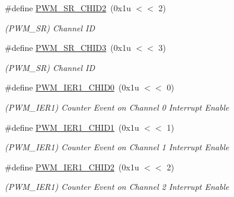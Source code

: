 \begin{DoxyCompactItemize}
\#define \mbox{\hyperlink{group__SAME70__PWM_gad0340aa3419df5dd39b9cd56c4b98862}{P\+W\+M\+\_\+\+S\+R\+\_\+\+C\+H\+I\+D2}}~(0x1u $<$$<$ 2)
\begin{DoxyCompactList}\small\item\em (P\+W\+M\+\_\+\+SR) Channel ID \end{DoxyCompactList}\item 
\mbox{\label{group__SAME70__PWM_gab8c704ff17cd4890571f8794c0ae0ecc}} 
\#define \mbox{\hyperlink{group__SAME70__PWM_gab8c704ff17cd4890571f8794c0ae0ecc}{P\+W\+M\+\_\+\+S\+R\+\_\+\+C\+H\+I\+D3}}~(0x1u $<$$<$ 3)
\begin{DoxyCompactList}\small\item\em (P\+W\+M\+\_\+\+SR) Channel ID \end{DoxyCompactList}\item 
\mbox{\label{group__SAME70__PWM_gacec10dad8055a8b5b3c7d901efc11c44}} 
\#define \mbox{\hyperlink{group__SAME70__PWM_gacec10dad8055a8b5b3c7d901efc11c44}{P\+W\+M\+\_\+\+I\+E\+R1\+\_\+\+C\+H\+I\+D0}}~(0x1u $<$$<$ 0)
\begin{DoxyCompactList}\small\item\em (P\+W\+M\+\_\+\+I\+E\+R1) Counter Event on Channel 0 Interrupt Enable \end{DoxyCompactList}\item 
\mbox{\label{group__SAME70__PWM_gadf1bd2e8c79a879b4137063f1c78db41}} 
\#define \mbox{\hyperlink{group__SAME70__PWM_gadf1bd2e8c79a879b4137063f1c78db41}{P\+W\+M\+\_\+\+I\+E\+R1\+\_\+\+C\+H\+I\+D1}}~(0x1u $<$$<$ 1)
\begin{DoxyCompactList}\small\item\em (P\+W\+M\+\_\+\+I\+E\+R1) Counter Event on Channel 1 Interrupt Enable \end{DoxyCompactList}\item 
\mbox{\label{group__SAME70__PWM_gaa396fa0bb6991b994c66401939fdabc8}} 
\#define \mbox{\hyperlink{group__SAME70__PWM_gaa396fa0bb6991b994c66401939fdabc8}{P\+W\+M\+\_\+\+I\+E\+R1\+\_\+\+C\+H\+I\+D2}}~(0x1u $<$$<$ 2)
\begin{DoxyCompactList}\small\item\em (P\+W\+M\+\_\+\+I\+E\+R1) Counter Event on Channel 2 Interrupt Enable \end{DoxyCompactList}\item 
$$
\end{DoxyCompactItemize}
